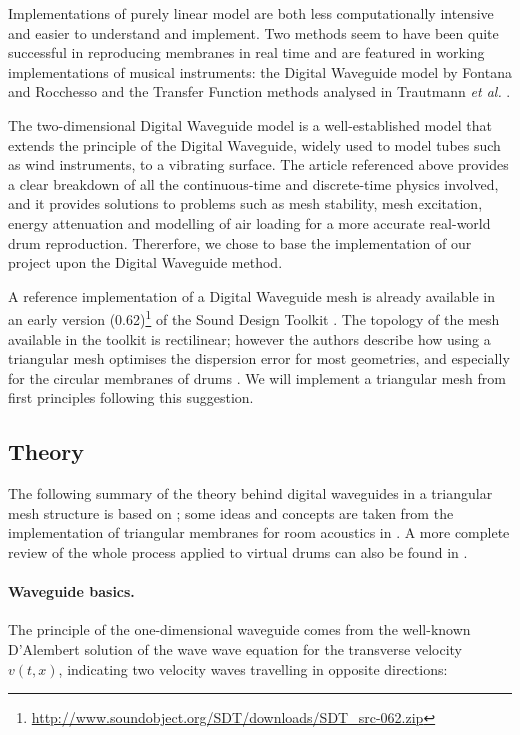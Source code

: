 \documentclass{article}
\begin{document}
Implementations of purely linear model are both less computationally
intensive and easier to understand and implement. Two methods
seem to have been quite successful in reproducing membranes in
real time and are featured in working implementations of musical
instruments: the Digital Waveguide model by Fontana and Rocchesso
\cite{fontana1998physical} and the Transfer Function methods
analysed in Trautmann \emph{et al.} \cite{trautmann2001physical}.

The two-dimensional Digital Waveguide model is a well-established
model that extends the principle of the Digital Waveguide,
widely used to model tubes such as wind instruments, to a vibrating
surface.
The article referenced above provides a clear breakdown
of all the continuous-time and discrete-time physics involved,
and it provides solutions to problems such as mesh stability,
mesh excitation, energy attenuation and modelling of air loading
for a more accurate real-world drum reproduction.
Thererfore, we chose to base the implementation of our project upon
the Digital Waveguide method.

A reference implementation of a Digital Waveguide mesh is already
available in an early version
(0.62)\footnote{
\url{http://www.soundobject.org/SDT/downloads/SDT_src-062.zip}}
of the Sound Design Toolkit \cite{baldan2017sound}.
The topology of the mesh available in the toolkit is rectilinear;
however the authors describe how using a triangular mesh
optimises the dispersion error for most geometries, and especially
for the circular membranes of drums \cite{fontana1998physical}.
We will implement a triangular mesh
from first principles following this
suggestion. 

\subsection{Theory}

The following summary of the theory behind digital waveguides in
a triangular mesh structure is based on \cite{fontana1998physical};
some ideas and concepts are taken from the implementation of
triangular membranes for room acoustics in \cite{murphy2000digital}.
A more complete review of the whole process applied to virtual drums
can also be found in \cite{laird2001physical}.

\paragraph{Waveguide basics.}
The principle of the one-dimensional waveguide comes from the well-known
D'Alembert solution of the
wave wave equation for the transverse velocity \(v(t, x)\),
indicating two velocity waves travelling in opposite
directions:
\end{document}
